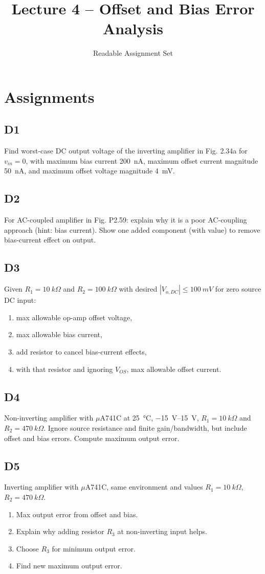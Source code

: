 \documentclass[12pt,a4paper]{article}
\title{Lecture 4 -- Offset and Bias Error Analysis}
\author{Readable Assignment Set}
\date{}
\begin{document}
\maketitle
\tableofcontents

\section{Assignments}
\subsection{D1}
Find worst-case DC output voltage of the inverting amplifier in Fig. 2.34a for $v_{in}=0$, with maximum bias current \SI{200}{nA}, maximum offset current magnitude \SI{50}{nA}, and maximum offset voltage magnitude \SI{4}{mV}.

\subsection{D2}
For AC-coupled amplifier in Fig. P2.59: explain why it is a poor AC-coupling approach (hint: bias current). Show one added component (with value) to remove bias-current effect on output.

\subsection{D3}
Given $R_1=\SI{10}{k\Omega}$ and $R_2=\SI{100}{k\Omega}$ with desired $|V_{o,DC}|\le\SI{100}{mV}$ for zero source DC input:
\begin{enumerate}[label=\alph*)]
\item max allowable op-amp offset voltage,
\item max allowable bias current,
\item add resistor to cancel bias-current effects,
\item with that resistor and ignoring $V_{OS}$, max allowable offset current.
\end{enumerate}

\subsection{D4}
Non-inverting amplifier with \(\mu\)A741C at \SI{25}{\celsius}, \SIrange{-15}{15}{V}, $R_1=\SI{10}{k\Omega}$ and $R_2=\SI{470}{k\Omega}$. Ignore source resistance and finite gain/bandwidth, but include offset and bias errors. Compute maximum output error.

\subsection{D5}
Inverting amplifier with \(\mu\)A741C, same environment and values $R_1=\SI{10}{k\Omega}$, $R_2=\SI{470}{k\Omega}$.
\begin{enumerate}
\item Max output error from offset and bias.
\item Explain why adding resistor $R_3$ at non-inverting input helps.
\item Choose $R_3$ for minimum output error.
\item Find new maximum output error.
\end{enumerate}
\end{document}
